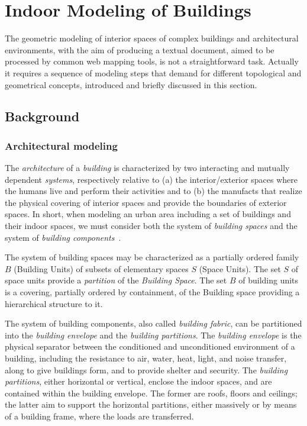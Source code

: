\documentclass[]{egpubl}
\begin{document}
\section{Indoor Modeling of Buildings}

The geometric modeling of interior spaces of complex buildings and architectural environments, with the aim of producing a textual document, aimed to be processed by common web mapping tools,  is not a straightforward task. Actually it requires a sequence of modeling steps that demand for different topological and geometrical concepts, introduced and briefly discussed in this section.

\subsection{Background}

\subsubsection*{Architectural modeling} 
The \emph{architecture} of a \emph{building} is characterized by two interacting and mutually dependent \emph{systems}, respectively relative to (a) the interior/exterior spaces where the humans live and perform their activities and to (b) the manufacts that realize the physical covering of interior spaces and provide the boundaries of exterior spaces. In short, when modeling an urban area including a set of buildings and their indoor spaces, we must consider both the system of \emph{building spaces} and the system of \emph{building components}~\cite{carrara:80,Carrar:1994:KCA:561911,gero:1996}.

The system of building spaces may be characterized as a partially ordered family $B$ (Building Units) of subsets of elementary spaces $S$ (Space Units). The set $S$ of space units provide a \emph{partition} of the \emph{Building Space}. The set $B$ of building units is a covering, partially ordered by containment, of the Building space providing a hierarchical structure to it.

The system of building components, also called \emph{building fabric}, can be partitioned into the  \emph{building envelope} and the \emph{building partitions}.
The \emph{building envelope} is the physical separator between the conditioned and unconditioned environment of a building, including the resistance to air, water, heat, light, and noise transfer, along to give buildings form, and to provide shelter and security.
The \emph{building partitions}, either horizontal or vertical, enclose the indoor spaces, and are contained within the building envelope. The former are roofs, floors and ceilings; the latter aim to support the horizontal partitions, either massively or by means of a building frame, where the loads are transferred.
\end{document}
